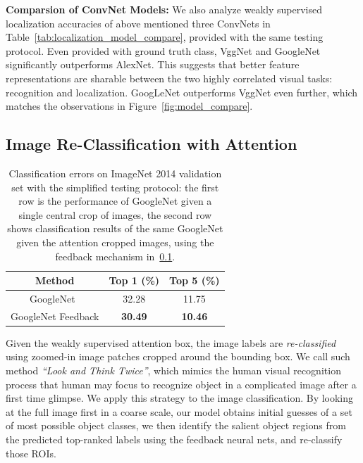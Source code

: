 \textbf{Comparsion of ConvNet Models:} We also analyze weakly supervised localization accuracies of above mentioned three ConvNets in Table~\ref{tab:localization_model_compare}, provided with the same testing protocol. Even provided with ground truth class, VggNet and GoogleNet significantly outperforms AlexNet.
This suggests that better feature representations are sharable between the two highly correlated visual tasks: recognition and localization. GoogLeNet outperforms VggNet even further, which matches the observations in Figure~\ref{fig:model_compare}.

\subsection{Image Re-Classification with Attention}
\label{subsec:re-classification}

\begin{table}
\centering
\small
\begin{tabular}{|c|c|c|}
\hline
Method & Top 1 (\%) & Top 5 (\%) \\ \hline
GoogleNet~\cite{Szegedy2014Going} & 32.28 & 11.75 \\ \hline
GoogleNet Feedback & \textbf{30.49} & \textbf{10.46} \\ \hline
\end{tabular}
\caption{Classification errors on ImageNet 2014 validation set with the simplified testing protocol: the first row is the performance of  GoogleNet given a single central crop of images, the second row shows classification results of the same GoogleNet given the attention cropped images, using the feedback mechanism in~\ref{subsec:re-classification}.}
\label{tab:reclassification_error}
\end{table}

Given the weakly supervised attention box, the image labels are {\em re-classified} using zoomed-in image patches cropped around the bounding box. We call such method {\em ``Look and Think Twice''}, which mimics the human visual recognition process that human may focus to recognize object in a complicated image after a first time glimpse. We apply this strategy to the image classification. By looking at the full image first in a coarse scale, our model obtains initial guesses of a set of most possible object classes, we then identify the salient object regions from the predicted top-ranked labels using the feedback neural nets, and re-classify those ROIs.

